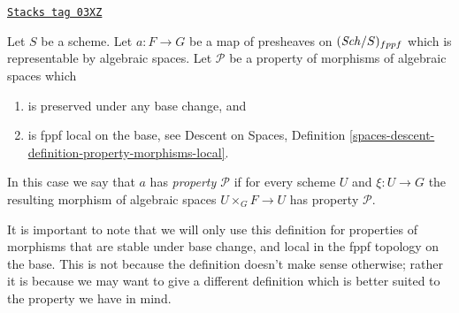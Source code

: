 \begin{definition}
\label{bootstrap-definition-property-transformation}
\href{https://stacks.math.columbia.edu/tag/03XZ}{\texttt{Stacks tag 03XZ}}

Let $S$ be a scheme. Let $a : F \to G$ be a map of presheaves on
$(\mathit{Sch}/S)_{fppf}$ which is representable by algebraic spaces.
Let $\mathcal{P}$ be a property of morphisms of algebraic spaces which
\begin{enumerate}
\item is preserved under any base change, and
\item is fppf local on the base, see
Descent on Spaces,
Definition \ref{spaces-descent-definition-property-morphisms-local}.
\end{enumerate}
In this case we say that $a$ has {\it property $\mathcal{P}$} if for every
scheme $U$ and $\xi : U \to G$ the resulting morphism of algebraic spaces
$U \times_G F \to U$ has property $\mathcal{P}$.
\end{definition}

It is important to note that we will only use this definition for
properties of morphisms that are stable under base change, and
local in the fppf topology on the base. This is
not because the definition doesn't make sense otherwise; rather it
is because we may want to give a different definition which is
better suited to the property we have in mind.

